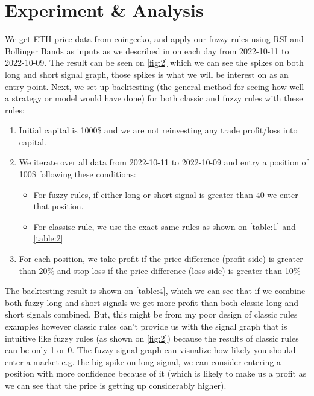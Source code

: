 \documentclass{article}
\begin{document}
\section*{Experiment \& Analysis}
We get ETH price data from coingecko, and apply our fuzzy rules using RSI and Bollinger Bands as inputs as we described in  on each
day from 2022-10-11 to 2022-10-09. The result can be seen on \cref{fig:2} which we can see the spikes on both long and short signal graph, 
those spikes is what we will be interest on as an entry point. Next, we set up backtesting 
(the general method for seeing how well a strategy or model would have done) for both classic and fuzzy rules with these rules:
\begin{enumerate}
    \item Initial capital is 1000\$ and we are not reinvesting any trade profit/loss into capital.
    \item {We iterate over all data from 2022-10-11 to 2022-10-09 and entry a position of 100\$ following these conditions: 
        \begin{itemize}
            \item For fuzzy rules, if either long or short signal is greater than 40 we enter that position.
            \item For classisc rule, we use the exact same rules as shown on \cref{table:1} and \cref{table:2}
        \end{itemize}
    }
    \item {For each position, we take profit if the price difference (profit side) is greater than 20\% 
        and stop-loss if the price difference (loss side) is greater than 10\%
    }
\end{enumerate}
The backtesting result is shown on \cref{table:4}, which we can see that if we combine both fuzzy long and short signals we get more
profit than both classic long and short signals combined. But, this might be from my poor design of classic rules examples however 
classic rules can't provide us with the signal graph that is intuitive like fuzzy rules (as shown on \cref{fig:2})
because the results of classic rules can be only 1 or 0. The fuzzy signal graph can visualize how likely you shoukd enter a market 
e.g. the big spike on long signal, we can consider entering a position with more confidence because of it (which is likely to make us 
a profit as we can see that the price is getting up considerably higher).
\end{document}
